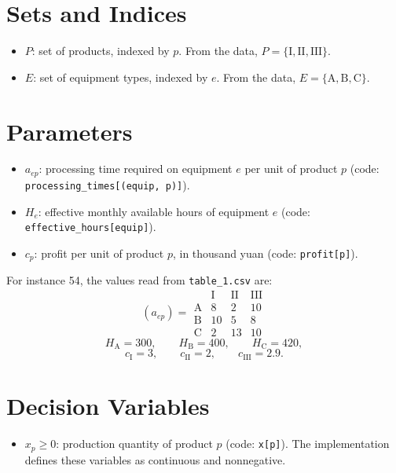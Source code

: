 \section*{Sets and Indices}

\begin{itemize}
    \item $P$: set of products, indexed by $p$. From the data, $P=\{\text{I},\text{II},\text{III}\}$.
    \item $E$: set of equipment types, indexed by $e$. From the data, $E=\{\text{A},\text{B},\text{C}\}$.
\end{itemize}

\section*{Parameters}

\begin{itemize}
    \item $a_{ep}$: processing time required on equipment $e$ per unit of product $p$ (code: \texttt{processing\_times[(equip, p)]}).
    \item $H_e$: effective monthly available hours of equipment $e$ (code: \texttt{effective\_hours[equip]}).
    \item $c_p$: profit per unit of product $p$, in thousand yuan (code: \texttt{profit[p]}).
\end{itemize}

For instance 54, the values read from \texttt{table\_1.csv} are:
\[
(a_{ep})=
\begin{array}{c|ccc}
 & \text{I} & \text{II} & \text{III}\\ \hline
\text{A} & 8 & 2 & 10\\
\text{B} & 10 & 5 & 8\\
\text{C} & 2 & 13 & 10
\end{array}
\]
\[
H_{\text{A}}=300,\qquad H_{\text{B}}=400,\qquad H_{\text{C}}=420,
\]
\[
c_{\text{I}}=3,\qquad c_{\text{II}}=2,\qquad c_{\text{III}}=2.9.
\]

\section*{Decision Variables}

\begin{itemize}
    \item $x_p \ge 0$: production quantity of product $p$ (code: \texttt{x[p]}). The implementation defines these variables as continuous and nonnegative.
\end{itemize}

